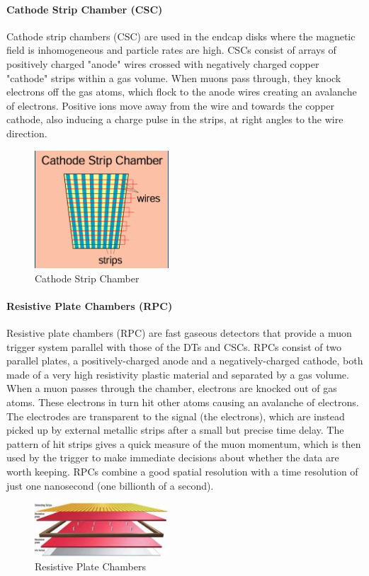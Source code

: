 \paragraph{Cathode Strip Chamber (CSC)}
Cathode strip chambers (CSC) are used in the endcap disks where the magnetic field is inhomogeneous and particle rates are high. CSCs consist of arrays of positively charged "anode" wires crossed with negatively charged copper "cathode" strips within a gas volume. When muons pass through, they knock electrons off the gas atoms, which flock to the anode wires creating an avalanche of electrons. Positive ions move away from the wire and towards the copper cathode, also inducing a charge pulse in the strips, at right angles to the wire direction.
\begin{figure}[H]
  \caption{Cathode Strip Chamber \label{fig:CSC}}
  \centering
\includegraphics[width=5cm]{CMS_chapter_plots/CSC}
\end{figure}

\paragraph{Resistive Plate Chambers (RPC)}
Resistive plate chambers (RPC) are fast gaseous detectors that provide a muon trigger system parallel with those of the DTs and CSCs. RPCs consist of two parallel plates, a positively-charged anode and a negatively-charged cathode, both made of a very high resistivity plastic material and separated by a gas volume. When a muon passes through the chamber, electrons are knocked out of gas atoms. These electrons in turn hit other atoms causing an avalanche of electrons. The electrodes are transparent to the signal (the electrons), which are instead picked up by external metallic strips after a small but precise time delay. The pattern of hit strips gives a quick measure of the muon momentum, which is then used by the trigger to make immediate decisions about whether the data are worth keeping. RPCs combine a good spatial resolution with a time resolution of just one nanosecond (one billionth of a second).
\begin{figure}[H]
  \caption{Resistive Plate Chambers \label{fig:RPClayers}}
  \centering
\includegraphics[width=5cm]{CMS_chapter_plots/RPClayers}
\end{figure}

